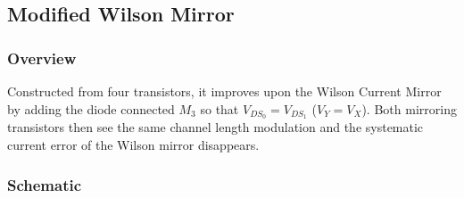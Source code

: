 \subsection{Modified Wilson Mirror}

\subsubsection{Overview}
Constructed from four transistors, it improves
upon the Wilson Current Mirror by adding the diode
connected \(M_3\) so that \(V_{DS_0} = V_{DS_1}\)
(\(V_Y = V_X\)). Both mirroring transistors then see the
same channel length modulation and the systematic
current error of the Wilson mirror disappears.

\subsubsection{Schematic}
